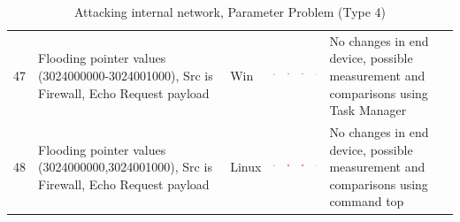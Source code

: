 \documentclass[12pt]{article}
\begin{document}
\begin{savenotes}
\begin{table}[!h]
{{\begin{tabular}{|C{1.0cm}|L{6.0cm}|C{1.5cm}|C{1.0cm}|C{1.0cm}|C{1.0cm}|C{1.0cm}|L{7.0cm}|}
47&Flooding pointer values (3024000000-3024001000), Src is Firewall, Echo Request payload&Win&\includegraphics[width=4mm, height=4mm]{ok}&\includegraphics[width=4mm, height=4mm]{notok}&\includegraphics[width=4mm, height=4mm]{notok}&\includegraphics[width=4mm, height=4mm]{ok}&No changes in end device, possible measurement and comparisons using Task Manager\\
48&Flooding pointer values (3024000000,3024001000), Src is Firewall, Echo Request payload&Linux&\includegraphics[width=4mm, height=4mm]{ok}&\includegraphics[width=4mm, height=4mm]{notok}&\includegraphics[width=4mm, height=4mm]{notok}&\includegraphics[width=4mm, height=4mm]{ok}&No changes in end device, possible measurement and comparisons using command top\\
\hline
\end{tabular}}}
\caption{Attacking internal network, Parameter Problem (Type 4)}
\label{table:attackInternalResults4}
\end{table}
\end{savenotes}
\end{document}
